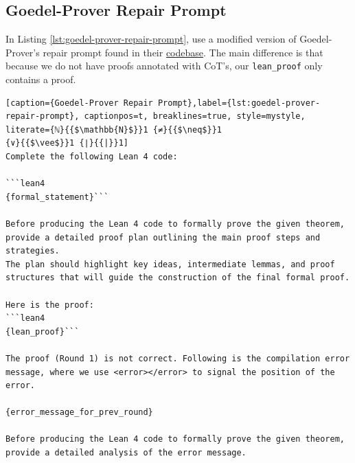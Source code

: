 \subsection{Goedel-Prover Repair Prompt}

In Listing \ref{lst:goedel-prover-repair-prompt}, use a modified version of Goedel-Prover's repair prompt found in their \href{https://github.com/Goedel-LM/Goedel-Prover-V2}{codebase}. 
The main difference is that because we do not have proofs annotated with CoT's, our \texttt{lean\_proof} only contains a proof. 

\begin{lstlisting}[caption={Goedel-Prover Repair Prompt},label={lst:goedel-prover-repair-prompt}, captionpos=t, breaklines=true, style=mystyle, literate={ℕ}{{$\mathbb{N}$}}1 {≠}{{$\neq$}}1
{∨}{{$\vee$}}1 {∣}{{|}}1]
Complete the following Lean 4 code:

```lean4
{formal_statement}```

Before producing the Lean 4 code to formally prove the given theorem, provide a detailed proof plan outlining the main proof steps and strategies.
The plan should highlight key ideas, intermediate lemmas, and proof structures that will guide the construction of the final formal proof.

Here is the proof:
```lean4
{lean_proof}```

The proof (Round 1) is not correct. Following is the compilation error message, where we use <error></error> to signal the position of the error.

{error_message_for_prev_round}

Before producing the Lean 4 code to formally prove the given theorem, provide a detailed analysis of the error message.
\end{lstlisting}

\newpage
